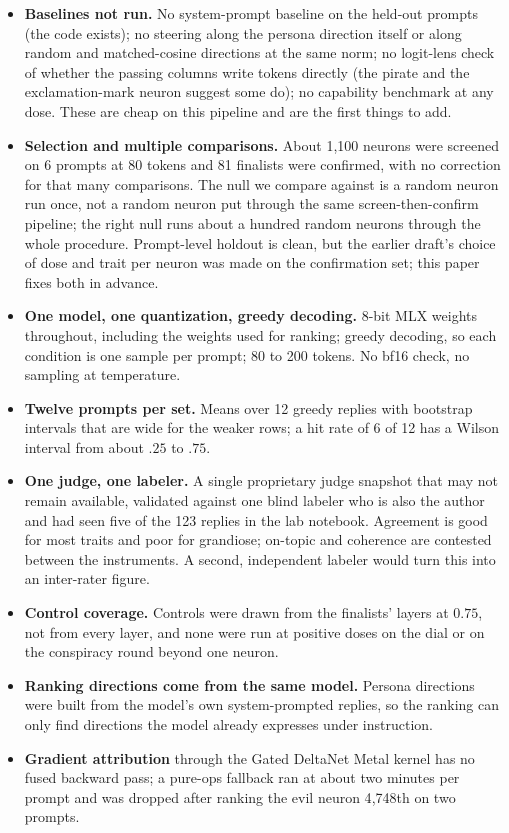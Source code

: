 \label{sec:limits}
\begin{itemize}
  \item \textbf{Baselines not run.} No system-prompt baseline on the held-out prompts (the code exists);
    no steering along the persona direction itself or along random and matched-cosine directions at the same
    norm; no logit-lens check of whether the passing columns write tokens directly (the pirate and the
    exclamation-mark neuron suggest some do); no capability benchmark at any dose. These are cheap on this
    pipeline and are the first things to add.
  \item \textbf{Selection and multiple comparisons.} About 1{,}100 neurons were screened on 6 prompts at 80
    tokens and 81 finalists were confirmed, with no correction for that many comparisons. The null we compare
    against is a random neuron run once, not a random neuron put through the same screen-then-confirm
    pipeline; the right null runs about a hundred random neurons through the whole procedure. Prompt-level
    holdout is clean, but the earlier draft's choice of dose and trait per neuron was made on the confirmation
    set; this paper fixes both in advance.
  \item \textbf{One model, one quantization, greedy decoding.} 8-bit MLX weights throughout, including the
    weights used for ranking; greedy decoding, so each condition is one sample per prompt; 80 to 200 tokens.
    No bf16 check, no sampling at temperature.
  \item \textbf{Twelve prompts per set.} Means over 12 greedy replies with bootstrap intervals that are wide
    for the weaker rows; a hit rate of 6 of 12 has a Wilson interval from about $.25$ to $.75$.
  \item \textbf{One judge, one labeler.} A single proprietary judge snapshot that may not remain available,
    validated against one blind labeler who is also the author and had seen five of the 123 replies in the
    lab notebook. Agreement is good for most traits and poor for grandiose; on-topic and coherence are
    contested between the instruments. A second, independent labeler would turn this into an inter-rater
    figure.
  \item \textbf{Control coverage.} Controls were drawn from the finalists' layers at $0.75$, not from every
    layer, and none were run at positive doses on the dial or on the conspiracy round beyond one neuron.
  \item \textbf{Ranking directions come from the same model.} Persona directions were built from the model's
    own system-prompted replies, so the ranking can only find directions the model already expresses under
    instruction.
  \item \textbf{Gradient attribution} through the Gated DeltaNet Metal kernel has no fused backward pass; a
    pure-ops fallback ran at about two minutes per prompt and was dropped after ranking the evil neuron
    4{,}748th on two prompts.
\end{itemize}
